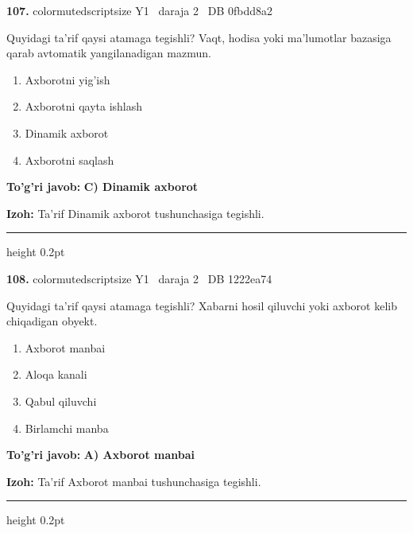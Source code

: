 \documentclass[10pt,a4paper,oneside]{article}
\begin{document}
\noindent\textbf{\color{ink}107.}  {color{muted}scriptsize Y1 \textbullet\ daraja 2 \textbullet\ DB 0fbdd8a2}
\par
Quyidagi ta'rif qaysi atamaga tegishli? Vaqt, hodisa yoki ma'lumotlar bazasiga qarab avtomatik yangilanadigan mazmun.
\begin{enumerate}[label=\Alph*),leftmargin=9mm]
\item Axborotni yig'ish
\item Axborotni qayta ishlash
\item Dinamik axborot
\item Axborotni saqlash
\end{enumerate}
\begin{tcolorbox}[enhanced,breakable,colback=teal!4,colframe=teal!50!black,boxrule=0.5pt,arc=1.1mm,left=3mm,right=3mm,top=1.7mm,bottom=1.7mm,before skip=2mm,after skip=2mm]
\textbf{\color{teal}To'g'ri javob:} \textbf{C) Dinamik axborot}
\par\smallskip
\textbf{Izoh:} Ta'rif Dinamik axborot tushunchasiga tegishli.
\end{tcolorbox}
\vspace{2mm}\hrule height 0.2pt \vspace{3mm}

\noindent\textbf{\color{ink}108.}  {color{muted}scriptsize Y1 \textbullet\ daraja 2 \textbullet\ DB 1222ea74}
\par
Quyidagi ta'rif qaysi atamaga tegishli? Xabarni hosil qiluvchi yoki axborot kelib chiqadigan obyekt.
\begin{enumerate}[label=\Alph*),leftmargin=9mm]
\item Axborot manbai
\item Aloqa kanali
\item Qabul qiluvchi
\item Birlamchi manba
\end{enumerate}
\begin{tcolorbox}[enhanced,breakable,colback=teal!4,colframe=teal!50!black,boxrule=0.5pt,arc=1.1mm,left=3mm,right=3mm,top=1.7mm,bottom=1.7mm,before skip=2mm,after skip=2mm]
\textbf{\color{teal}To'g'ri javob:} \textbf{A) Axborot manbai}
\par\smallskip
\textbf{Izoh:} Ta'rif Axborot manbai tushunchasiga tegishli.
\end{tcolorbox}
\vspace{2mm}\hrule height 0.2pt \vspace{3mm}
\end{document}
